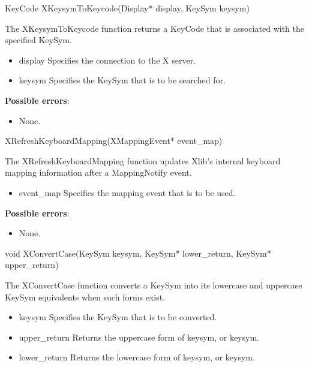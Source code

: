 \documentclass{report}
\begin{document}
\begin{itemize}
        \begin{cppcode}
        KeyCode XKeysymToKeycode(Display* display, KeySym keysym)
        \end{cppcode}
        \bigbreak \noindent
        The XKeysymToKeycode function returns a KeyCode that is associated with the specified KeySym.
        \begin{itemize}
            \item display Specifies the connection to the X server.
            \item keysym Specifies the KeySym that is to be searched for.
        \end{itemize}
        \textbf{Possible errors}:
        \begin{itemize}
            \item None.
        \end{itemize}

        \begin{cppcode}
        XRefreshKeyboardMapping(XMappingEvent* event_map)
        \end{cppcode}
        \bigbreak \noindent
        The XRefreshKeyboardMapping function updates Xlib's internal keyboard mapping information after a MappingNotify event.
        \begin{itemize}
            \item event\_map Specifies the mapping event that is to be used.
        \end{itemize}

        \textbf{Possible errors}:
        \begin{itemize}
            \item None.
        \end{itemize}

        \begin{cppcode}
        void XConvertCase(KeySym keysym, KeySym* lower_return, KeySym* upper_return)
        \end{cppcode}
        \bigbreak \noindent
        The XConvertCase function converts a KeySym into its lowercase and uppercase KeySym equivalents when such forms exist.
        \begin{itemize}
            \item keysym Specifies the KeySym that is to be converted.
            \item upper\_return Returns the uppercase form of keysym, or keysym.
            \item lower\_return Returns the lowercase form of keysym, or keysym.
        \end{itemize}


\end{itemize}
\end{document}
